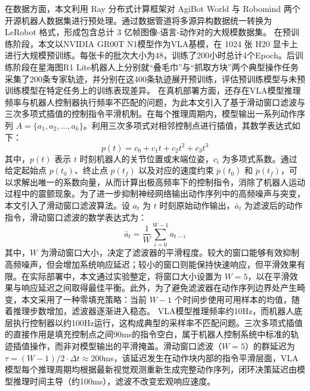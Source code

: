 在数据方面，本文利用 Ray 分布式计算框架对 AgiBot World \cite{bu2025agibot} 与 Robomind \cite{wu2024robomind} 两个开源机器人数据集进行预处理。通过数据管道将多源异构数据统一转换为 LeRobot 格式，形成包含总计 3 亿帧图像-语言-动作对的大规模数据集。
在预训练阶段，本文以NVIDIA GR00T N1模型作为VLA基模，在 1024 张 H20 显卡上进行大规模预训练。每张卡的批次大小为48，训练了200小时总计4个Epoch。后训练阶段在星海图R1 Lite机器人上分别就“叠毛巾”与“抓取方块”两个典型操作任务采集了200条专家轨迹，并分别在这400条轨迹展开预训练，评估预训练模型与未预训练模型在特定任务上的训练表现差异。
在真机部署方面，还存在VLA模型推理频率与机器人控制器执行频率不匹配的问题，为此本文引入了基于滑动窗口滤波与三次多项式插值的控制指令平滑机制。在每个推理周期内，模型输出一系列动作序列 $A = \{a_1, a_2, \dots, a_k\}$。利用三次多项式对相邻控制点进行插值，其数学表达式如下：
\begin{equation}
p(t) = c_0 + c_1 t + c_2 t^2 + c_3 t^3
\end{equation}
其中，$p(t)$ 表示 $t$ 时刻机器人的关节位置或末端位姿，$c_i$ 为多项式系数。通过给定起始点 $p(t_0)$、终止点 $p(t_f)$ 以及对应的速度约束 $\dot{p}(t_0)$ 和 $\dot{p}(t_f)$，可以求解出唯一的系数向量，从而计算出极高频率下的控制指令，消除了机器人运动过程中的震颤现象。为了进一步抑制神经网络输出动作序列中的高频噪声与突变，本文引入了滑动窗口滤波算法。设 $a_t$ 为 $t$ 时刻原始动作输出，$\bar{a}_t$ 为滤波后的动作指令，滑动窗口滤波的数学表达式为：
\begin{equation}
\bar{a}_t = \frac{1}{W} \sum_{i=0}^{W-1} a_{t-i}
\end{equation}
其中，$W$ 为滑动窗口大小，决定了滤波器的平滑程度。较大的窗口能够有效抑制高频噪声，但会增加系统响应延迟；较小的窗口则能保持快速响应，但平滑效果有限。在实际部署中，本文通过实验整定，将窗口大小设置为 $W=5$，以在平滑效果与响应延迟之间取得最佳平衡。此外，为了避免滤波器在动作序列边界处产生畸变，本文采用了一种零填充策略：当前 $W-1$ 个时间步使用可用样本的均值，随着推理步数增加，滤波器逐渐进入稳态。
VLA模型推理频率约10Hz，而机器人底层执行控制器以约100Hz运行，这构成典型的采样率不匹配问题。三次多项式插值的直接作用是填充控制点之间90ms的指令空白，属于机器人控制系统中标准的轨迹插值操作，而非对模型输出的平滑掩盖。滑动窗口滤波（$W=5$）的群延迟为 $\tau = (W-1)/2 \cdot \Delta t \approx 200$ms，该延迟发生在动作块内部的指令平滑层面，VLA模型每个推理周期均根据最新视觉观测重新生成完整动作序列，闭环决策延迟由模型推理时间主导（约100ms），滤波不改变宏观响应速度。

